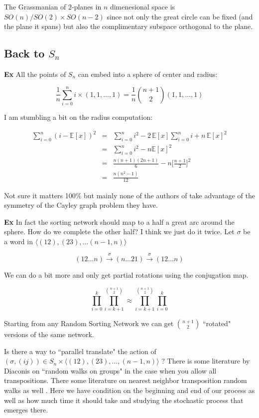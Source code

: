 \documentclass[12pt]{article}
\begin{document}
{\noindent The Grassmanian of 2-planes in $n$ dimenesional space is $SO(n)/SO(2)\times SO(n-2)$ since not only the great circle can be fixed (and the plane it spans) but also the complimentary subspace orthogonal to the plane.

\subsection{Back to $S_n$}

\noindent \textbf{Ex} All the points of $S_n$ can embed into a sphere of center and radius:

$$ \frac{1}{n}\sum_{i=0}^n i \times (1,1,\dots, 1) = \frac{1}{n}\binom{n+1}{2}(1,1,\dots, 1) $$ 

\noindent I am stumbling a bit on the radius computation:

\begin{eqnarray*} \sum_{i=0}^n (i - \mathbb{E}[x] )^2 &=& 
\sum_{i=0}^n i^2 -
2 \,\mathbb{E}[x]\sum_{i=0}^n i + n\,\mathbb{E}[x]^2 \\
&=& 
\sum_{i=0}^n i^2 -  n\mathbb{E}[x]^2 \\
&=&
\frac{n(n+1)(2n+1)}{6} - n  \bigg[\frac{n+1}{2}\bigg]^2 \\
&=& \frac{n(n^2 - 1)}{12} \end{eqnarray*}

\noindent Not sure it matters 100\% but mainly none of the authors of \cite{AHRV} take advantage of the symmetry of the Cayley graph problem they have. \newline

\noindent 

\noindent \textbf{Ex} In fact the sorting network should map to a half a great arc around the sphere.  How do we complete the other half?  I think we just do it twice.  Let $\sigma $ be a word in $\langle (12), (23), \dots (n-1,n) \rangle $

$$ (12\dots n) \stackrel{\sigma}{\to} (n\dots 21) \stackrel{\sigma}{\to} (12\dots n)$$

\noindent We can do a bit more and only get partial rotations using the conjugation map.

$$ \prod_{i=0}^k \prod_{i=k+1}^{\binom{n+1}{2}} \approx \prod_{i=k+1}^{\binom{n+1}{2}} \prod_{i=0}^k  $$

\noindent Starting from any Random Sorting Network we can get $\binom{n+1}{2}$ ``rotated" versions of the same network.  \newline

\noindent Is there a way to ``parallel translate" the action of $(\sigma, (ij)) \in S_n \times \langle (12), (23), \dots, (n-1,n)\rangle $ ?  There is some literature by Diaconis on ``random walks on groups" in the case when you allow all transpositions.  There some literature on nearest neighbor transposition random walks as well \cite{W}.  Here we have condition on the beginning and end of our process as well as how much time it should take and studying the stochastic process that emerges there. \newline

}
\end{document}
